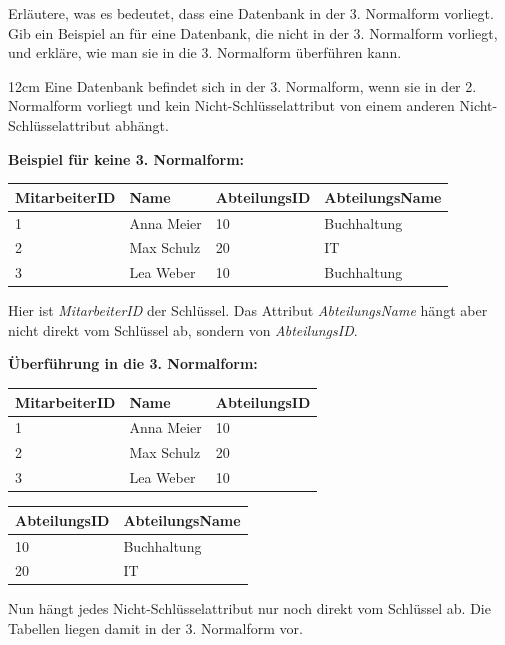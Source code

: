 \question[4]
Erläutere, was es bedeutet, dass eine Datenbank in der 3. Normalform vorliegt.
Gib ein Beispiel an für eine Datenbank, die nicht in der 3. Normalform vorliegt,
und erkläre, wie man sie in die 3. Normalform überführen kann.


\begin{solutionbox}{12cm}
Eine Datenbank befindet sich in der 3. Normalform, wenn sie in der 2. Normalform vorliegt
und kein Nicht-Schlüsselattribut von einem anderen Nicht-Schlüsselattribut abhängt.

\vspace{0.2cm}

\textbf{Beispiel für keine 3. Normalform:}

\begin{center}
\begin{tabular}{|l|l|l|l|}
\hline
MitarbeiterID & Name & AbteilungsID & AbteilungsName \\
\hline
1 & Anna Meier & 10 & Buchhaltung \\
2 & Max Schulz & 20 & IT \\
3 & Lea Weber & 10 & Buchhaltung \\
\hline
\end{tabular}
\end{center}

Hier ist \textit{MitarbeiterID} der Schlüssel. Das Attribut \textit{AbteilungsName} hängt aber nicht direkt vom Schlüssel ab,
sondern von \textit{AbteilungsID}. 

\vspace{0.2cm}

\textbf{Überführung in die 3. Normalform:}

\begin{center}
\begin{tabular}{|l|l|l|}
\hline
MitarbeiterID & Name & AbteilungsID \\
\hline
1 & Anna Meier & 10 \\
2 & Max Schulz & 20 \\
3 & Lea Weber & 10 \\
\hline
\end{tabular}
\end{center}

\begin{center}
\begin{tabular}{|l|l|}
\hline
AbteilungsID & AbteilungsName \\
\hline
10 & Buchhaltung \\
20 & IT \\
\hline
\end{tabular}
\end{center}

Nun hängt jedes Nicht-Schlüsselattribut nur noch direkt vom Schlüssel ab.
Die Tabellen liegen damit in der 3. Normalform vor.

\end{solutionbox}
